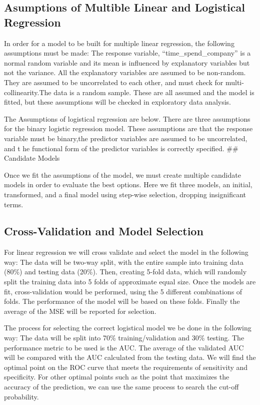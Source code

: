 \documentclass[
]{article}
\begin{document}
\subsection{Asumptions of Multible Linear and Logistical
Regression}\label{asumptions-of-multible-linear-and-logistical-regression}

In order for a model to be built for multiple linear regression, the
following assumptions must be made: The response variable,
``time\_spend\_company'' is a normal random variable and its mean is
influenced by explanatory variables but not the variance. All the
explanatory variables are assumed to be non-random. They are assumed to
be uncorrelated to each other, and must check for multi-collinearity.The
data is a random sample. These are all assumed and the model is fitted,
but these assumptions will be checked in exploratory data analysis.

The Assumptions of logistical regression are below. There are three
assumptions for the binary logistic regression model. These assumptions
are that the response variable must be binary,the predictor variables
are assumed to be uncorrelated, and t he functional form of the
predictor variables is correctly specified. \#\# Candidate Models

Once we fit the assumptions of the model, we must create multiple
candidate models in order to evaluate the best options. Here we fit
three models, an initial, transformed, and a final model using step-wise
selection, dropping insignificant terms.

\subsection{Cross-Validation and Model
Selection}\label{cross-validation-and-model-selection}

For linear regression we will cross validate and select the model in the
following way: The data will be two-way split, with the entire sample
into training data (80\%) and testing data (20\%). Then, creating 5-fold
data, which will randomly split the training data into 5 folds of
approximate equal size. Once the models are fit, cross-validation would
be performed, using the 5 different combinations of folds. The
performance of the model will be based on these folds. Finally the
average of the MSE will be reported for selection.

The process for selecting the correct logistical model we be done in the
following way: The data will be split into 70\% training/validation and
30\% testing. The performance metric to be used is the AUC. The average
of the validated AUC will be compared with the AUC calculated from the
testing data. We will find the optimal point on the ROC curve that meets
the requirements of sensitivity and specificity. For other optimal
points such as the point that maximizes the accuracy of the prediction,
we can use the same process to search the cut-off probability.
\end{document}
